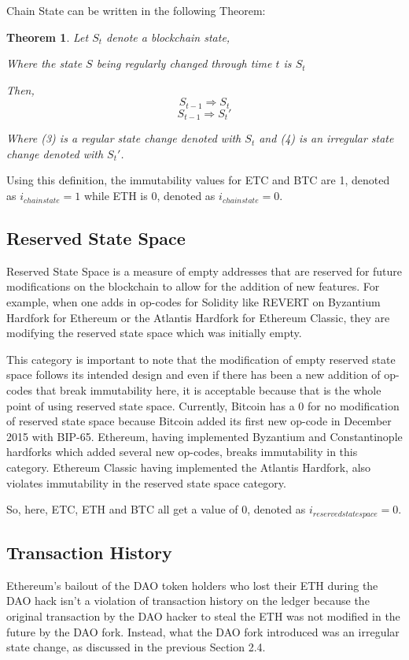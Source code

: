 \documentclass{article}
\newtheorem{theorem}{Theorem}
\begin{document}
Chain State can be written in the following Theorem:
\begin{theorem}
Let $S_{t}$ denote a blockchain state,

Where the state $S$ being regularly changed through time $t$ is
$S_{t}$

Then,
\begin{equation}
    S_{t-1}\Rightarrow S_{t} 
\end{equation}
\begin{equation}
    S_{t-1}\Rightarrow S_{t}'
\end{equation}

Where (3) is a regular state change denoted with $S_{t}$ and (4) is an irregular state change denoted with $S$$_{t}$$'$.
\end{theorem}

Using this definition, the immutability values for ETC and BTC are 1, denoted as $i_{chain state} = 1$ while ETH is 0, denoted as $i_{chain state} = 0$.

\subsection{Reserved State Space}
Reserved State Space is a measure of empty addresses that are reserved for future modifications on the blockchain to allow for the addition of new features. For example, when one adds in op-codes for Solidity like REVERT on Byzantium Hardfork\cite{byzantium} for Ethereum or the Atlantis Hardfork\cite{atlantis} for Ethereum Classic, they are modifying the reserved state space which was initially empty.

This category is important to note that the modification of empty reserved state space follows its intended design and even if there has been a new addition of op-codes that break immutability here, it is acceptable because that is the whole point of using reserved state space. Currently, Bitcoin has a 0 for no modification of reserved state space because Bitcoin added its first new op-code in December 2015 with BIP-65\cite{bip65}. Ethereum, having implemented Byzantium and Constantinople hardforks which added several new op-codes, breaks immutability in this category. Ethereum Classic having implemented the Atlantis Hardfork, also violates immutability in the reserved state space category.

So, here, ETC, ETH and BTC all get a value of 0, denoted as $i_{reserved state space} = 0$.

\subsection{Transaction History}
Ethereum’s bailout of the DAO token holders who lost their ETH during the DAO hack isn’t a violation of transaction history on the ledger because the original transaction by the DAO hacker to steal the ETH was not modified in the future by the DAO fork. Instead, what the DAO fork introduced was an irregular state change, as discussed in the previous Section 2.4.
\end{document}
